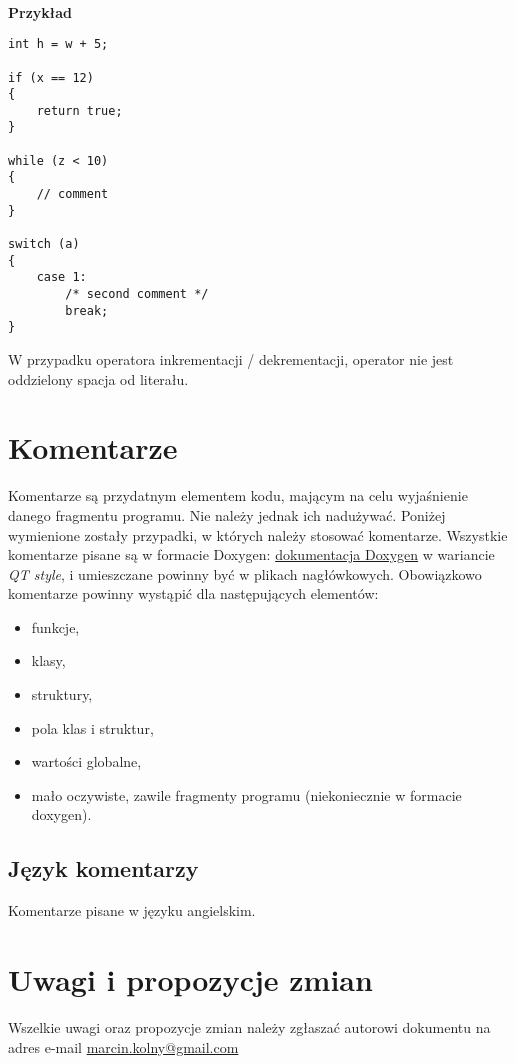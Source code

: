 \documentclass[titlepage]{article}
\begin{document}
\paragraph{}
\textbf{Przykład}
\begin{lstlisting}
int h = w + 5;

if (x == 12)
{
	return true;
}

while (z < 10)
{
	// comment
}

switch (a)
{
	case 1:
		/* second comment */
		break;
}
\end{lstlisting}
W przypadku operatora inkrementacji / dekrementacji, operator nie jest oddzielony spacja od literału.
\section{Komentarze}
Komentarze są przydatnym elementem kodu, mającym na celu wyjaśnienie danego fragmentu programu. Nie należy jednak ich nadużywać. Poniżej wymienione zostały przypadki, w których należy stosować komentarze. 
Wszystkie komentarze pisane są w formacie Doxygen: \href{http://doxygen.org/}{dokumentacja Doxygen} w wariancie \textit{QT style}, i umieszczane powinny być w plikach nagłówkowych.
Obowiązkowo komentarze powinny wystąpić dla następujących elementów:
\begin{itemize}
\item funkcje,
\item klasy,
\item struktury,
\item pola klas i struktur,
\item wartości globalne,
\item mało oczywiste, zawile fragmenty programu (niekoniecznie w formacie doxygen).
\end{itemize}

\subsection{Język komentarzy}
Komentarze pisane w języku angielskim.
\section{Uwagi i propozycje zmian}
Wszelkie uwagi oraz propozycje zmian należy zgłaszać autorowi dokumentu na adres e-mail \href{mailto:marcin.kolny@gmail.com}{marcin.kolny@gmail.com}
\end{document}
